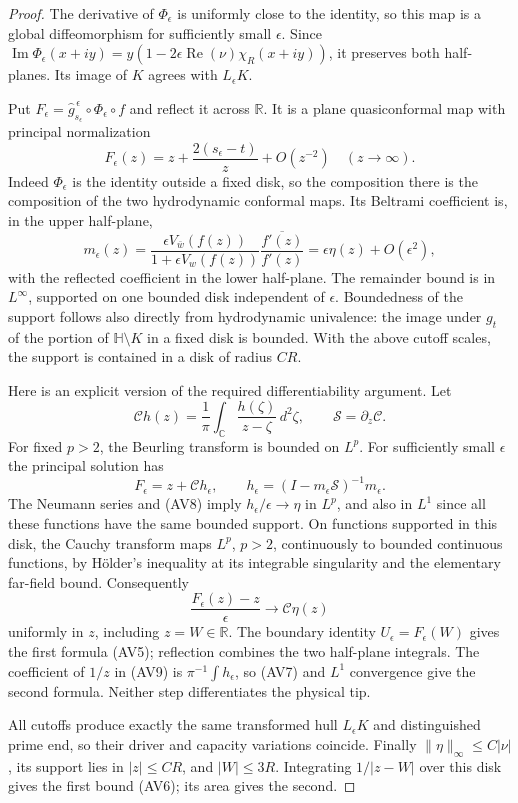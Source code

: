 \documentclass[11pt]{article}
\theoremstyle{definition}\newtheorem{definition}[theorem]{Definition}
\theoremstyle{remark}\newtheorem{remark}[theorem]{Remark}
\begin{document}
\begin{proof}
The derivative of $\Phi_\epsilon$ is uniformly close to the identity,
so this map is a global diffeomorphism for sufficiently small $\epsilon$.
Since $\operatorname{Im}\Phi_\epsilon(x+iy)
=y(1-2\epsilon\operatorname{Re}(\nu)\chi_R(x+iy))$, it preserves
both half-planes. Its image of $K$ agrees with $L_\epsilon K$.

Put
$F_\epsilon=\widehat g^{\,\epsilon}_{s_\epsilon}
\circ\Phi_\epsilon\circ f$ and reflect it across $\mathbb R$.
It is a plane quasiconformal map with principal normalization
\[
 F_\epsilon(z)
  =z+\frac{2(s_\epsilon-t)}z+O(z^{-2})
   \quad (z\to\infty).
 \tag{AV7}
\]
Indeed $\Phi_\epsilon$ is the identity outside a fixed disk, so the
composition there is the composition of the two hydrodynamic conformal
maps. Its Beltrami coefficient is, in the upper half-plane,
\[
 m_\epsilon(z)=
 \frac{\epsilon V_{\bar w}(f(z))}
      {1+\epsilon V_w(f(z))}
       \frac{\overline{f'(z)}}{f'(z)}
   =\epsilon\eta(z)+O(\epsilon^2),
 \tag{AV8}
\]
with the reflected coefficient in the lower half-plane. The remainder
bound is in $L^\infty$, supported on one bounded disk independent of
$\epsilon$. Boundedness of the support follows also directly from
hydrodynamic univalence: the image under $g_t$ of the portion of
$\mathbb H\setminus K$ in a fixed disk is bounded. With the above
cutoff scales, the support is contained in a disk of radius $CR$.

Here is an explicit version of the required differentiability argument.
Let
\[
 \mathcal C h(z)=\frac1\pi\int_{\mathbb C}
                     \frac{h(\zeta)}{z-\zeta}\,d^2\zeta,
 \qquad \mathcal S=\partial_z\mathcal C.
\]
For fixed $p>2$, the Beurling transform is bounded on $L^p$. For
sufficiently small $\epsilon$ the principal solution has
\[
 F_\epsilon=z+\mathcal C h_\epsilon,\qquad
 h_\epsilon=(I-m_\epsilon\mathcal S)^{-1}m_\epsilon.
 \tag{AV9}
\]
The Neumann series and (AV8) imply
$h_\epsilon/\epsilon\to\eta$ in $L^p$, and also in $L^1$ since
all these functions have the same bounded support. On functions
supported in this disk, the Cauchy transform maps $L^p$, $p>2$,
continuously to bounded continuous functions, by H\"older's inequality
at its integrable singularity and the elementary far-field bound.
Consequently
\[
 \frac{F_\epsilon(z)-z}{\epsilon}
       \longrightarrow\mathcal C\eta(z)
 \tag{AV10}
\]
uniformly in $z$, including $z=W\in\mathbb R$.
The boundary identity $U_\epsilon=F_\epsilon(W)$ gives the first
formula (AV5); reflection combines the two half-plane integrals.
The coefficient of $1/z$ in (AV9) is
$\pi^{-1}\int h_\epsilon$, so (AV7) and $L^1$ convergence give
the second formula. Neither step differentiates the physical tip.

All cutoffs produce exactly the same transformed hull $L_\epsilon K$
and distinguished prime end, so their driver and capacity variations
coincide. Finally $\|\eta\|_\infty\le C|\nu|$, its support lies in
$|z|\le CR$, and $|W|\le3R$. Integrating $1/|z-W|$ over this disk
gives the first bound (AV6); its area gives the second.
\end{proof}
\end{document}

